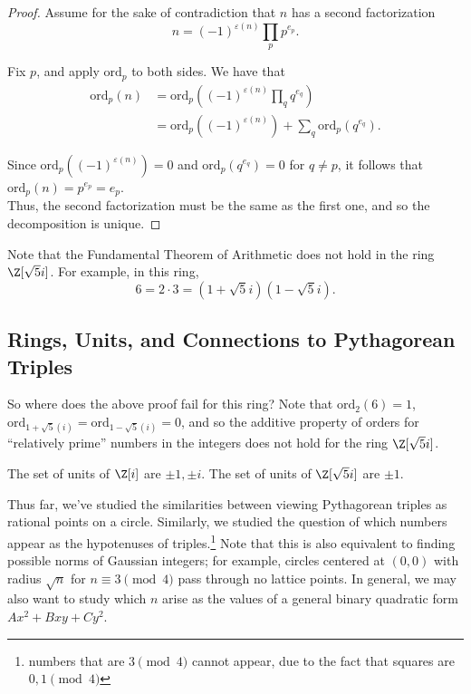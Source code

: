 \documentclass[11pt]{article}
\begin{document}
\begin{proof}
Assume for the sake of contradiction that $n$ has a second factorization
\[
    n = (-1)^{\varepsilon(n)} \prod_{p} p^{e_p}.
\]

Fix $p$, and apply $\mathrm{ord}_p$ to both sides. We have that
\begin{align*}
    \mathrm{ord}_p(n) &= \mathrm{ord}_p \left( (-1)^{\varepsilon(n)} \prod_{q} q^{e_q} \right) \\
    &= \mathrm{ord}_p \left( (-1)^{\varepsilon(n)} \right) + \sum_q \mathrm{ord}_p(q^{e_q}). 
\end{align*}

Since $\mathrm{ord}_p \left( (-1)^{\varepsilon(n)} \right) = 0$ and $\mathrm{ord}_p(q^{e_q}) = 0$ for $q \neq p$, it follows that
$\mathrm{ord}_p(n) = p^{e_p} = e_p$. \\

Thus, the second factorization must be the same as the first one, and so the decomposition is unique.
\end{proof}

Note that the Fundamental Theorem of Arithmetic does not hold in the ring $\Z[\sqrt{5}i]$. For example, in this ring,
\[
    6 = 2\cdot 3 = (1+\sqrt{5}i)(1-\sqrt{5}i).
\]

\subsection{Rings, Units, and Connections to Pythagorean Triples}

So where does the above proof fail for this ring? Note that $\mathrm{ord}_2(6) = 1$, $\mathrm{ord}_{1+\sqrt{5}(i)} = \mathrm{ord}_{1-\sqrt{5}(i)} = 0$,
and so the additive property of orders for ``relatively prime'' numbers in the integers does not hold for the ring $\Z[\sqrt{5}i]$. 

\begin{exercise}
The set of units of $\Z[i]$ are $\pm 1, \pm i$.
The set of units of $\Z[\sqrt{5}i]$ are $\pm 1$.
\end{exercise}

Thus far, we've studied the similarities between viewing Pythagorean triples as rational points on a circle. Similarly, we
studied the question of which numbers appear as the hypotenuses of triples.\footnote{numbers that are $3 \pmod 4$ cannot appear, due to the fact that squares are $0, 1 \pmod {4}$}
Note that this is also equivalent to finding possible norms of Gaussian integers; for example, circles centered at $(0, 0)$ with radius $\sqrt{n}$ for $n \equiv 3 \pmod 4$ pass through no lattice points.
In general, we may also want to study which $n$ arise as the values of a general binary quadratic form $Ax^2 + Bxy + Cy^2$.
\end{document}
